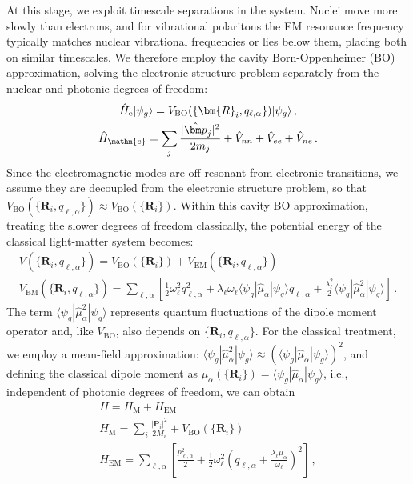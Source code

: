 At this stage, we exploit timescale separations in the system.
Nuclei move more slowly than electrons, and for vibrational polaritons the EM resonance frequency typically matches nuclear vibrational frequencies or lies below them, placing both on similar timescales.
We therefore employ the cavity Born-Oppenheimer (BO) approximation, solving the electronic structure problem separately from the nuclear and photonic degrees of freedom:
\begin{gather}
\hat{H}_\mathrm{e} | \psi_g \rangle = V_\mathrm{BO}(\{ \bm{R}_i,q_{\ell,\alpha} \}) | \psi_g \rangle \,, \\
\hat{H}_\mathm{e} = \sum_j \frac{|\hat{\bm p}_j|^{2}}{2m_j}+\hat{V}_{nn}+\hat{V}_{ee}+\hat{V}_{ne} \,.
\end{gather}
Since the electromagnetic modes are off-resonant from electronic transitions, we assume they are decoupled from the electronic structure problem, so that $V_\mathrm{BO}(\{ \bm{R}_i,q_{\ell,\alpha} \}) \approx V_\mathrm{BO}(\{ \bm{R}_i\})$. %
Within this cavity BO approximation, treating the slower degrees of freedom classically, the potential energy of the classical light-matter system becomes:
\begin{gather}
V(\{ \bm{R}_i,q_{\ell,\alpha} \}) = V_\mathrm{BO}(\{ \bm{R}_i \})  + V_\mathrm{EM}(\{ \bm{R}_i,q_{\ell,\alpha} \})
\\
V_\mathrm{EM}(\{ \bm{R}_i,q_{\ell,\alpha} \}) =  \sum_{\ell,\alpha} \left[\frac{1}{2} \omega_\ell^2 q_{\ell,\alpha}^2+ \lambda_\ell \omega_\ell \langle \psi_g |\hat{\mu}_\alpha |\psi_g \rangle q_{\ell,\alpha} + \frac{\lambda_\ell^2}{2 } \langle \psi_g | \hat{\mu}_\alpha^2 |\psi_g \rangle \right] \,.
\end{gather}
The term $\langle \psi_g | \hat{\mu}_\alpha^2 |\psi_g \rangle$ represents quantum fluctuations of the dipole moment operator and, like $V_\mathrm{BO}$, also depends on $\{ \bm{R}_i,q_{\ell,\alpha} \}$.
For the classical treatment, we employ a mean-field approximation: $\langle \psi_g | \hat{\mu}_\alpha^2 |\psi_g \rangle \approx \left(\langle \psi_g | \hat{\mu}_\alpha |\psi_g \rangle \right)^2$, and defining the classical dipole moment as $\mu_\alpha(\{\bm{R}_i\}) = \langle \psi_g | \hat{\mu}_\alpha |\psi_g \rangle$, i.e., independent of photonic degrees of freedom, we can obtain %
\begin{gather}
H  = H_\mathrm{M}+H_\mathrm{EM} \label{eq:H-classical}
\\
H_\mathrm{M} = \sum_i \frac{|\bm{P}_i|^{2}}{2M_i} + V_\mathrm{BO}(\{ \bm{R}_i \}) \label{eq:HM-classical}
\\
H_\mathrm{EM} = \sum_{\ell,\alpha} \left[ \frac{p_{\ell,\alpha}^2}{2}+ \frac{1}{2} \omega_\ell^2 \left(q_{\ell,\alpha} +\frac{\lambda_\ell \mu_\alpha}{\omega_\ell} \right)^2 \right] \,,\label{eq:HF-classical}
\end{gather}
